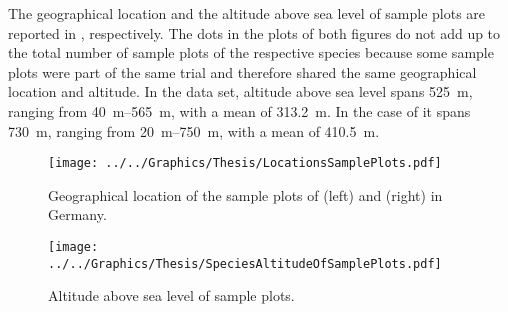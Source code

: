 The geographical location and the altitude above sea level of sample plots are reported in , respectively.  The dots in the plots of both figures do not add up to the total number of sample plots of the respective species because some sample plots were part of the same trial and therefore shared the same geographical location and altitude.  In the \Beech{} data set, altitude above sea level spans \SI{525}{\meter}, ranging from \SIrange{40}{565}{\meter}, with a mean of \SI{313.2}{\meter}.  In the case of \Spruce{} it spans \SI{730}{\meter}, ranging from \SIrange{20}{750}{\meter}, with a mean of \SI{410.5}{\meter}.

\begin{figure}[h]
  \centering
  \texttt{[image: ../../Graphics/Thesis/LocationsSamplePlots.pdf]}
  \caption{Geographical location of the sample plots of \Beech{} (left) and \Spruce{} (right) in Germany.}
  \label{fig:LocationsSamplePlots}
\end{figure}

\begin{figure}[h]
  \centering
  \texttt{[image: ../../Graphics/Thesis/SpeciesAltitudeOfSamplePlots.pdf]}
  \caption{Altitude above sea level of sample plots.}
  \label{fig:SpeciesAltitudeOfSamplePlots}
\end{figure}

